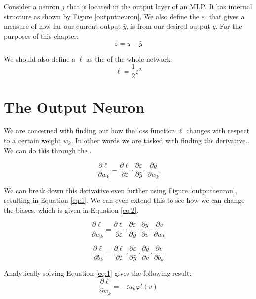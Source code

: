 Consider a neuron $j$ that is located in the output layer of an MLP. It has internal structure as shown by Figure \ref{outputneuron}. We also define the  $\varepsilon$, that gives a measure of how far our current output $\hat{y}$, is from our desired output $y$. For the purposes of this chapter:
\[  \varepsilon =  y - \hat{y}\]

We should also define a  $\ell$ as the  of the whole network.
\[  \ell  = \frac{1}{2}\varepsilon^2 \]	

\section{The Output Neuron}

We are concerned with finding out how the loss function $\ell$ changes with respect to a certain weight $w_k$. In other words we are tasked with finding the derivative.. We can do this through the .

\[	\frac{\partial\ell}{\partial w_k} = \frac{\partial \ell}{\partial \varepsilon}\cdot\frac{\partial\varepsilon}{\partial\hat{y}}\cdot\frac{\partial\hat{y}}{\partial w_k}\]

We can break down this derivative even further using Figure \ref{outputneuron}, resulting in Equation \ref{eq:1}. We can even extend this to see how we can change the biases, which is given in Equation \ref{eq:2}.

\begin{equation}
	\label{eq:1}
	\frac{\partial\ell}{\partial w_k} = \frac{\partial \ell}{\partial \varepsilon}\cdot\frac{\partial\varepsilon}{\partial\hat{y}}\cdot\frac{\partial\hat{y}}{\partial v}\cdot\frac{\partial v}{\partial w_k}
\end{equation}

\begin{equation}
	\label{eq:2}
	\frac{\partial\ell}{\partial b_k} = \frac{\partial \ell}{\partial \varepsilon}\cdot\frac{\partial\varepsilon}{\partial\hat{y}}\cdot\frac{\partial\hat{y}}{\partial v}\cdot\frac{\partial v}{\partial b_k}
\end{equation}

Analytically solving Equation \ref{eq:1} gives the following result:
	\[ \frac{\partial\ell}{\partial w_k} = -\varepsilon a_k \varphi'(v)	\]


